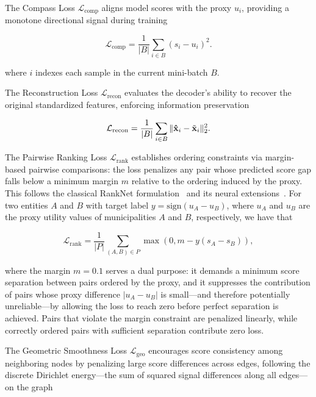 \documentclass[english]{sbrt}
\begin{document}
The Compass Loss $\mathcal{L}_\mathrm{comp}$ aligns model scores with the proxy
$u_i$, providing a monotone directional signal during training

\begin{equation}
  \mathcal{L}_{\mathrm{comp}} = \frac{1}{|B|} \sum_{i \in B} (s_i - u_i)^2.
\end{equation}

\noindent
where $i$ indexes each sample in the current mini-batch $B$.

The Reconstruction Loss $\mathcal{L}_\mathrm{recon}$ evaluates the decoder's
ability to recover the original standardized features, enforcing information
preservation

\begin{equation}
  \mathcal{L}_{\mathrm{recon}}
  = \frac{1}{|B|} \sum_{i \in B} \|\mathbf{\hat{x}}_i - \tilde{\mathbf{x}}_i\|_2^2.
\end{equation}

The Pairwise Ranking Loss $\mathcal{L}_\mathrm{rank}$ establishes ordering
constraints via margin-based pairwise comparisons: the loss penalizes any pair
whose predicted score gap falls below a minimum margin $m$ relative to the
ordering induced by the proxy. This follows the classical RankNet
formulation~\cite{burges2005learning} and its neural
extensions~\cite{koppel2025pairwise}. For two entities $A$ and $B$ with target
label $y = \mathrm{sign}(u_A - u_B)$, where $u_A$ and $u_B$ are the proxy
utility values of municipalities $A$ and $B$, respectively, we have that

\begin{equation}
  \mathcal{L}_{\mathrm{rank}}
  = \frac{1}{|P|} \sum_{(A,B) \in P} \max(0, m - y(s_A - s_B)),
\end{equation}

\noindent
where the margin $m=0{.}1$ serves a dual purpose:
it demands a minimum score
separation between pairs ordered by the proxy, and it suppresses the
contribution of pairs whose proxy difference $|u_A - u_B|$ is small---and
therefore potentially unreliable---by allowing the loss to reach zero before
perfect separation is achieved. Pairs that violate the margin constraint are
penalized linearly, while correctly ordered pairs with sufficient separation
contribute zero loss.

The Geometric Smoothness Loss $\mathcal{L}_\mathrm{geo}$ encourages score
consistency among neighboring nodes by penalizing large score differences across
edges, following the discrete Dirichlet energy---the sum of squared signal
differences along all edges---on the graph
\end{document}

